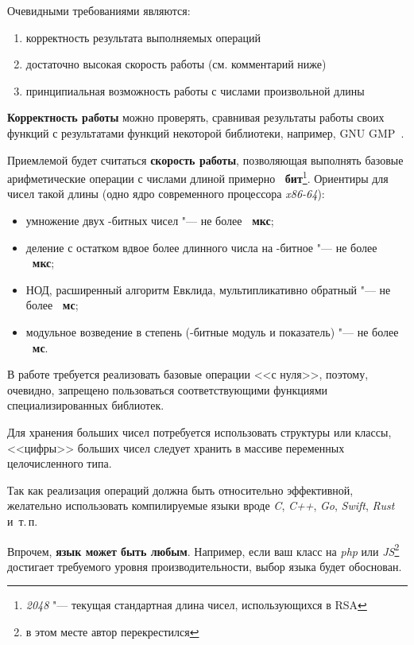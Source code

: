 \documentclass{ca-capstone}
\begin{document}
\requirements
Очевидными требованиями являются:
\begin{enumerate}
  \item корректность результата выполняемых операций
  \item достаточно высокая скорость работы (см. комментарий ниже)
  \item принципиальная возможность работы с числами произвольной длины
\end{enumerate}

\textbf{Корректность работы} можно проверять, сравнивая результаты работы своих функций с
результатами функций некоторой библиотеки, например, GNU GMP~\cite{gmp}.

Приемлемой будет считаться \textbf{скорость работы}, позволяющая выполнять базовые
арифметические операции с числами длиной примерно
\textbf{\ReqBits~бит}\footnote{\emph{2048} "--- текущая стандартная длина чисел,
использующихся в RSA}. Ориентиры для чисел такой длины (одно ядро современного процессора
\emph{x86-64}):
\begin{itemize}
  \item умножение двух \ReqBits-битных чисел "--- не более \textbf{\ReqMulUs~мкс};
  \item деление с остатком вдвое более длинного числа на \ReqBits-битное "--- не более
    \textbf{\ReqDivUs~мкс};
  \item НОД, расширенный алгоритм Евклида, мультипликативно обратный "--- не более
    \textbf{\ReqGcdMs~мс};
  \item модульное возведение в степень (\ReqBits-битные модуль и показатель) "--- не более
    \textbf{\ReqPowmodMs~мс}.
\end{itemize}

\details
В работе требуется реализовать базовые операции <<с нуля>>, поэтому, очевидно, запрещено
пользоваться соответствующими функциями специализированных библиотек.

Для хранения больших чисел потребуется использовать структуры или классы, <<цифры>> больших
чисел следует хранить в массиве переменных целочисленного типа.

Так как реализация операций должна быть относительно эффективной, желательно использовать
компилируемые языки вроде \emph{C}, \emph{C++}, \emph{Go}, \emph{Swift}, \emph{Rust} и~т.\,п.

Впрочем, \textbf{язык может быть любым}. Например, если ваш класс на \emph{php} или
\emph{JS}\footnote{в этом месте автор перекрестился} достигает требуемого уровня
производительности, выбор языка будет обоснован.
\end{document}
